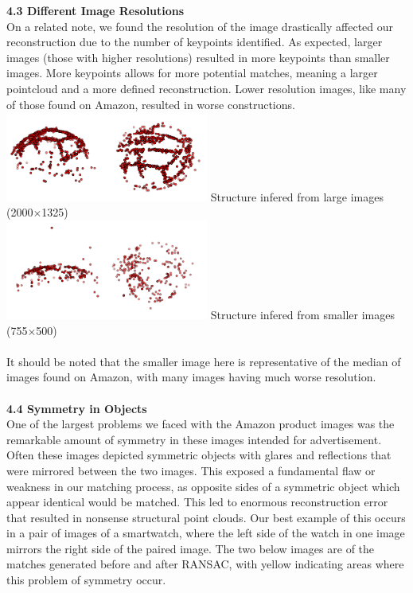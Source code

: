 \documentclass[12pt]{article}
\begin{document}
\begin{multicols}{2}
{\large \textbf{4.3 Different Image Resolutions}}\\
On a related note, we found the resolution of the image drastically affected our reconstruction due to the number of keypoints identified. As expected, larger images (those with higher resolutions) resulted in more keypoints than smaller images. More keypoints allows for more potential matches, meaning a larger pointcloud and a more defined reconstruction. Lower resolution images, like many of those found on Amazon,  resulted in worse constructions. 
\includegraphics[width=0.5\textwidth]{images/VBallMediumSurf_SideBySide.png}
Structure infered from large images (2000$\times$1325) \\
\includegraphics[width=0.5\textwidth]{images/VBallSmallSurf_SideBySide.png}
Structure infered from smaller images (755$\times$500) \\\\
It should be noted that the smaller image here is representative of the median of images found on Amazon, with many images having much worse resolution. \\\\
{\large \textbf{4.4 Symmetry in Objects}}\\
One of the largest problems we faced with the Amazon product images was the remarkable amount of symmetry in these images intended for advertisement. Often these images depicted symmetric objects with glares and reflections that were mirrored between the two images. This exposed a fundamental flaw or weakness in our matching process, as opposite sides of a symmetric object which appear identical would be matched. This led to enormous reconstruction error that resulted in nonsense structural point clouds. Our best example of this occurs in a pair of images of a smartwatch, where the left side of the watch in one image mirrors the right side of the paired image. The two below images are of the matches generated before and after RANSAC, with yellow indicating areas where this problem of symmetry occur.\\\\

\end{multicols}
\end{document}
